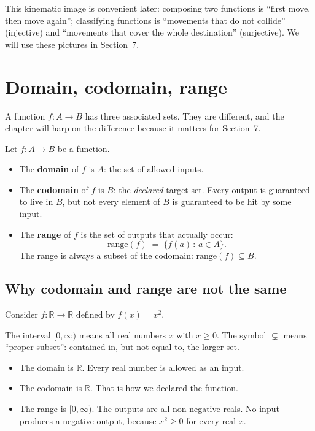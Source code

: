 This kinematic image is convenient later: composing two functions is ``first move, then move again''; classifying functions is ``movements that do not collide'' (injective) and ``movements that cover the whole destination'' (surjective). We will use these pictures in Section~7.


\section{Domain, codomain, range}

A function $f : A \to B$ has three associated sets. They are different, and the chapter will harp on the difference because it matters for Section~7.

\begin{definition}
Let $f : A \to B$ be a function.
\begin{itemize}
  \item The \textbf{domain} of $f$ is $A$: the set of allowed inputs.
  \item The \textbf{codomain} of $f$ is $B$: the \emph{declared} target set. Every output is guaranteed to live in $B$, but not every element of $B$ is guaranteed to be hit by some input.
  \item The \textbf{range} of $f$ is the set of outputs that actually occur:
    \[
      \mathrm{range}(f) \;=\; \{f(a) \,:\, a \in A\}.
    \]
    The range is always a subset of the codomain: $\mathrm{range}(f) \subseteq B$.
\end{itemize}
\end{definition}

\subsection*{Why codomain and range are not the same}

Consider $f : \mathbb{R} \to \mathbb{R}$ defined by $f(x) = x^2$.

The interval $[0,\infty)$ means all real numbers $x$ with $x \geq 0$. The symbol $\subsetneq$ means ``proper subset'': contained in, but not equal to, the larger set.

\begin{itemize}
  \item The domain is $\mathbb{R}$. Every real number is allowed as an input.
  \item The codomain is $\mathbb{R}$. That is how we declared the function.
  \item The range is $[0, \infty)$. The outputs are all non-negative reals. No input produces a negative output, because $x^2 \geq 0$ for every real $x$.
\end{itemize}

